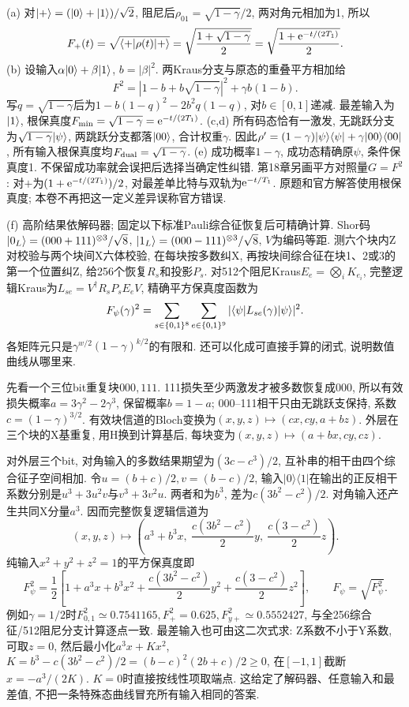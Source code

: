 \begin{solution}(a) 对$\lvert +\rangle=(\lvert 0\rangle+\lvert 1\rangle)/\sqrt2$, 阻尼后$\rho_{01}=\sqrt{1-\gamma}/2$, 两对角元相加为1, 所以
\[F_+(t)=\sqrt{\langle +\rvert\rho(t)\lvert +\rangle}=\sqrt{\frac{1+\sqrt{1-\gamma}}2}=\sqrt{\frac{1+\mathrm e^{-t/(2T_1)}}2}.\]
(b) 设输入$\alpha\lvert 0\rangle+\beta\lvert 1\rangle$, $b=|\beta|^2$. 两Kraus分支与原态的重叠平方相加给
\[F^2=|1-b+b\sqrt{1-\gamma}|^2+\gamma b(1-b).\]
写$q=\sqrt{1-\gamma}$后为$1-b(1-q)^2-2b^2q(1-q)$, 对$b\in[0,1]$递减. 最差输入为$\lvert 1\rangle$, 根保真度$F_{\min}=\sqrt{1-\gamma}=\mathrm e^{-t/(2T_1)}$.
(c,d) 所有码态恰有一激发, 无跳跃分支为$\sqrt{1-\gamma}\lvert \psi\rangle$, 两跳跃分支都落$\lvert 00\rangle$, 合计权重$\gamma$. 因此$\rho'=(1-\gamma)\lvert \psi\rangle\langle \psi\rvert+\gamma\lvert 00\rangle\langle 00\rvert$, 所有输入根保真度均$F_{\rm dual}=\sqrt{1-\gamma}$.
(e) 成功概率$1-\gamma$, 成功态精确原$\psi$, 条件保真度1. 不保留成功率就会误把后选择当确定性纠错. 第18章另画平方对照量$G=F^2$: 对$+$为$(1+\mathrm e^{-t/(2T_1)})/2$, 对最差单比特与双轨为$\mathrm e^{-t/T_1}$. 原题和官方解答使用根保真度; 本卷不再把这一定义差异误称官方错误.

(f) 高阶结果依解码器; 固定以下标准Pauli综合征恢复后可精确计算. Shor码$\lvert 0_L\rangle=(000+111)^{\otimes3}/\sqrt8$, $\lvert 1_L\rangle=(000-111)^{\otimes3}/\sqrt8$, $V$为编码等距. 测六个块内Z对校验与两个块间X六体校验, 在每块按多数纠X, 再按块间综合征在块1、2或3的第一个位置纠Z, 给256个恢复$R_s$和投影$P_s$. 对512个阻尼Kraus$E_e=\bigotimes_iK_{e_i}$, 完整逻辑Kraus为$L_{se}=V^\dagger R_sP_sE_eV$, 精确平方保真度函数为
\[F_\psi(\gamma)^2=\sum_{s\in\{0,1\}^8}\sum_{e\in\{0,1\}^9}|\langle \psi\rvert L_{se}(\gamma)\lvert \psi\rangle|^2.\]
各矩阵元只是$\gamma^{w/2}(1-\gamma)^{k/2}$的有限和. 还可以化成可直接手算的闭式, 说明数值曲线从哪里来.

先看一个三位bit重复块$000,111$. 111损失至少两激发才被多数恢复成000, 所以有效损失概率$a=3\gamma^2-2\gamma^3$, 保留概率$b=1-a$; 000--111相干只由无跳跃支保持, 系数$c=(1-\gamma)^{3/2}$. 有效块信道的Bloch变换为$(x,y,z)\mapsto(cx,cy,a+bz)$. 外层在三个块的X基重复, 用H换到计算基后, 每块变为$(x,y,z)\mapsto(a+bx,cy,cz)$.

对外层三个bit, 对角输入的多数结果期望为$(3c-c^3)/2$, 互补串的相干由四个综合征子空间相加. 令$u=(b+c)/2,v=(b-c)/2$, 输入$|0\rangle\langle1|$在输出的正反相干系数分别是$u^3+3u^2v$与$v^3+3v^2u$. 两者和为$b^3$, 差为$c(3b^2-c^2)/2$. 对角输入还产生共同X分量$a^3$. 因而完整恢复逻辑信道为
\[(x,y,z)\longmapsto
 \left(a^3+b^3x,\ \frac{c(3b^2-c^2)}2y,\ \frac{c(3-c^2)}2z\right).\]
纯输入$x^2+y^2+z^2=1$的平方保真度即
\[F_\psi^2=\frac12\left[1+a^3x+b^3x^2+
 \frac{c(3b^2-c^2)}2y^2+\frac{c(3-c^2)}2z^2\right],\qquad
 F_\psi=\sqrt{F_\psi^2}.\]
例如$\gamma=1/2$时$F_{0,1}^2\simeq0.7541165,F_+^2=0.625,F_{y+}^2\simeq0.5552427$, 与全256综合征/512阻尼分支计算逐点一致. 最差输入也可由这二次式求: Z系数不小于Y系数, 可取$z=0$, 然后最小化$a^3x+Kx^2$, $K=b^3-c(3b^2-c^2)/2=(b-c)^2(2b+c)/2\ge0$, 在$[-1,1]$截断$x=-a^3/(2K)$. $K=0$时直接按线性项取端点. 这给定了解码器、任意输入和最差值, 不把一条特殊态曲线冒充所有输入相同的答案.
\end{solution}
